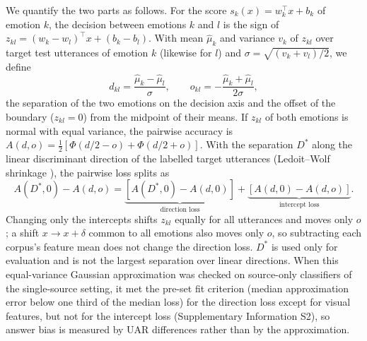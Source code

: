 We quantify the two parts as follows. For the score $s_k(x)=w_k^\top x+b_k$ of emotion $k$, the decision between emotions $k$ and $l$ is the sign of $z_{kl}=(w_k-w_l)^\top x+(b_k-b_l)$. With mean $\hat\mu_k$ and variance $v_k$ of $z_{kl}$ over target test utterances of emotion $k$ (likewise for $l$) and $\sigma=\sqrt{(v_k+v_l)/2}$, we define
\begin{equation}
d_{kl}=\frac{\hat\mu_k-\hat\mu_l}{\sigma},\qquad o_{kl}=-\frac{\hat\mu_k+\hat\mu_l}{2\sigma},
\end{equation}
the separation of the two emotions on the decision axis and the offset of the boundary ($z_{kl}=0$) from the midpoint of their means. If $z_{kl}$ of both emotions is normal with equal variance, the pairwise accuracy is $A(d,o)=\tfrac12[\Phi(d/2-o)+\Phi(d/2+o)]$. With the separation $D^{*}$ along the linear discriminant direction of the labelled target utterances (Ledoit--Wolf shrinkage \cite{ledoit2004}), the pairwise loss splits as
\begin{equation}
A(D^{*},0)-A(d,o)=\underbrace{[A(D^{*},0)-A(d,0)]}_{\text{direction loss}}+\underbrace{[A(d,0)-A(d,o)]}_{\text{intercept loss}}.
\end{equation}
Changing only the intercepts shifts $z_{kl}$ equally for all utterances and moves only $o$; a shift $x\to x+\delta$ common to all emotions also moves only $o$, so subtracting each corpus's feature mean does not change the direction loss. $D^{*}$ is used only for evaluation and is not the largest separation over linear directions. When this equal-variance Gaussian approximation was checked on source-only classifiers of the single-source setting, it met the pre-set fit criterion (median approximation error below one third of the median loss) for the direction loss except for visual features, but not for the intercept loss (Supplementary Information S2), so answer bias is measured by UAR differences rather than by the approximation.

